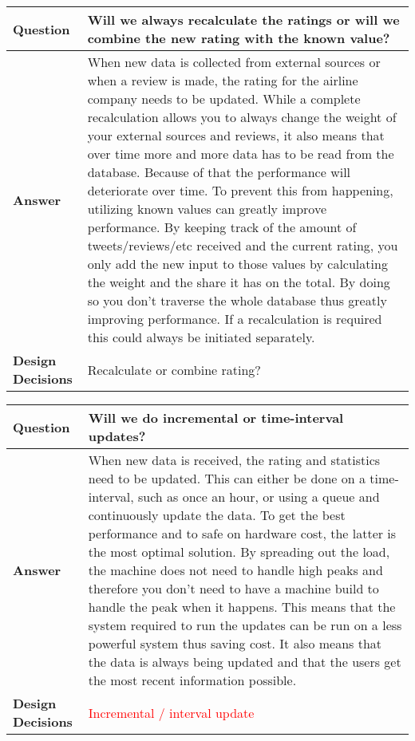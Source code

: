 \begin{longtable}{| l |  p{12cm} |}
\hline
\textbf{Question} & \textbf{Will we always recalculate the ratings or will we combine the new rating with the known value? }  \\ \hline
\textbf{Answer} & When new data is collected from external sources or when a review is made, the rating for the airline company needs to be updated. While a complete recalculation allows you to always change the weight of your external sources and reviews, it also means that over time more and more data has to be read from the database. Because of that the performance will deteriorate over time.
To prevent this from happening, utilizing known values can greatly improve performance. By keeping track of the amount of tweets/reviews/etc received and the current rating, you only add the new input to those values by calculating the weight and the share it has on the total. By doing so you don't traverse the whole database thus greatly improving performance. If a recalculation is required this could always be initiated separately.
  \\ \hline
\textbf{Design Decisions} & Recalculate or combine rating?  \\ \hline
\end{longtable}

\begin{longtable}{| l |  p{12cm} |}
\hline
\textbf{Question} & \textbf{Will we do incremental or time-interval updates? }  \\ \hline
\textbf{Answer} & When new data is received, the rating and statistics need to be updated. This can either be done on a time-interval, such as once an hour, or using a queue and continuously update the data. To get the best performance and to safe on hardware cost, the latter is the most optimal solution. By spreading out the load, the machine does not need to handle high peaks and therefore you don't need to have a machine build to handle the peak when it happens. This means that the system required to run the updates can be run on a less powerful system thus saving cost. It also means that the data is always being updated and that the users get the most recent information possible.

  \\ \hline
\textbf{Design Decisions} & \textcolor{red}{Incremental / interval update} \\ \hline
\end{longtable}

